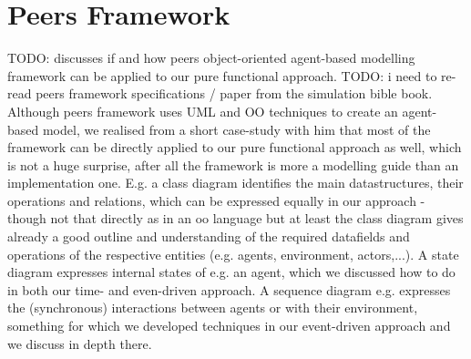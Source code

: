 \section{Peers Framework}
TODO: discusses if and how peers object-oriented agent-based modelling framework can be applied to our pure functional approach. TODO: i need to re-read peers framework specifications / paper from the simulation bible book.
Although peers framework uses UML and OO techniques to create an agent-based model, we realised from a short case-study with him that most of the framework can be directly applied to our pure functional approach as well, which is not a huge surprise, after all the framework is more a modelling guide than an implementation one. E.g. a class diagram identifies the main datastructures, their operations and relations, which can be expressed equally in our approach - though not that directly as in an oo language but at least the class diagram gives already a good outline and understanding of the required datafields and operations of the respective entities (e.g. agents, environment, actors,...). A state diagram expresses internal states of e.g. an agent, which we discussed how to do in both our time- and even-driven approach. A sequence diagram e.g. expresses the (synchronous) interactions between agents or with their environment, something for which we developed techniques in our event-driven approach and we discuss in depth there. 